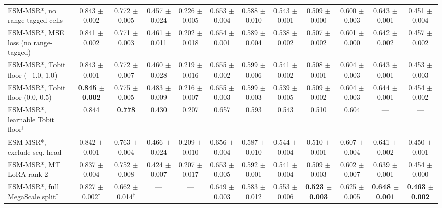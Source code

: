 \begin{table}[H]
{\begin{tabular}{lccccccccccc}
ESM-MSR*, no range-tagged cells & 0.843 $\pm$ 0.002 & 0.772 $\pm$ 0.005 & 0.457 $\pm$ 0.024 & 0.226 $\pm$ 0.005 & 0.653 $\pm$ 0.004 & 0.588 $\pm$ 0.010 & 0.543 $\pm$ 0.001 & 0.509 $\pm$ 0.000 & 0.600 $\pm$ 0.003 & 0.643 $\pm$ 0.001 & 0.451 $\pm$ 0.004 \\
ESM-MSR*, MSE loss (no range-tagged) & 0.841 $\pm$ 0.002 & 0.771 $\pm$ 0.003 & 0.461 $\pm$ 0.011 & 0.202 $\pm$ 0.018 & 0.654 $\pm$ 0.001 & 0.589 $\pm$ 0.004 & 0.538 $\pm$ 0.002 & 0.507 $\pm$ 0.002 & 0.601 $\pm$ 0.000 & 0.642 $\pm$ 0.002 & 0.457 $\pm$ 0.002 \\
ESM-MSR*, Tobit floor ($-1.0$, $1.0$) & 0.843 $\pm$ 0.001 & 0.772 $\pm$ 0.007 & 0.460 $\pm$ 0.028 & 0.219 $\pm$ 0.016 & 0.655 $\pm$ 0.002 & 0.599 $\pm$ 0.006 & 0.541 $\pm$ 0.002 & 0.508 $\pm$ 0.001 & 0.604 $\pm$ 0.003 & 0.643 $\pm$ 0.001 & 0.453 $\pm$ 0.003 \\
ESM-MSR*, Tobit floor ($0.0$, $0.5$) & \textbf{0.845 $\pm$ 0.002} & 0.775 $\pm$ 0.005 & 0.483 $\pm$ 0.009 & 0.216 $\pm$ 0.007 & 0.655 $\pm$ 0.003 & 0.599 $\pm$ 0.003 & 0.539 $\pm$ 0.005 & 0.509 $\pm$ 0.002 & 0.604 $\pm$ 0.003 & 0.644 $\pm$ 0.001 & 0.454 $\pm$ 0.002 \\
ESM-MSR*, learnable Tobit floor$^\ddagger$ & 0.844 & \textbf{0.778} & 0.430 & 0.207 & 0.657 & 0.593 & 0.543 & 0.510 & 0.604 & --- & --- \\
ESM-MSR*, exclude seq. head & 0.842 $\pm$ 0.001 & 0.763 $\pm$ 0.004 & 0.466 $\pm$ 0.024 & 0.209 $\pm$ 0.010 & 0.656 $\pm$ 0.004 & 0.587 $\pm$ 0.010 & 0.544 $\pm$ 0.004 & 0.510 $\pm$ 0.001 & 0.607 $\pm$ 0.004 & 0.641 $\pm$ 0.002 & 0.450 $\pm$ 0.001 \\
ESM-MSR*, MT LoRA rank 2 & 0.837 $\pm$ 0.004 & 0.752 $\pm$ 0.008 & 0.424 $\pm$ 0.007 & 0.207 $\pm$ 0.017 & 0.653 $\pm$ 0.005 & 0.592 $\pm$ 0.001 & 0.541 $\pm$ 0.004 & 0.509 $\pm$ 0.003 & 0.602 $\pm$ 0.007 & 0.639 $\pm$ 0.001 & 0.454 $\pm$ 0.000 \\
ESM-MSR*, full MegaScale split$^\dagger$ & 0.827 $\pm$ 0.002$^\dagger$ & 0.662 $\pm$ 0.014$^\dagger$ & --- & --- & 0.649 $\pm$ 0.003 & 0.583 $\pm$ 0.012 & 0.553 $\pm$ 0.006 & \textbf{0.523 $\pm$ 0.003} & 0.625 $\pm$ 0.005 & \textbf{0.648 $\pm$ 0.001} & \textbf{0.463 $\pm$ 0.002} \\
\bottomrule
\end{tabular}
}
\end{table}
